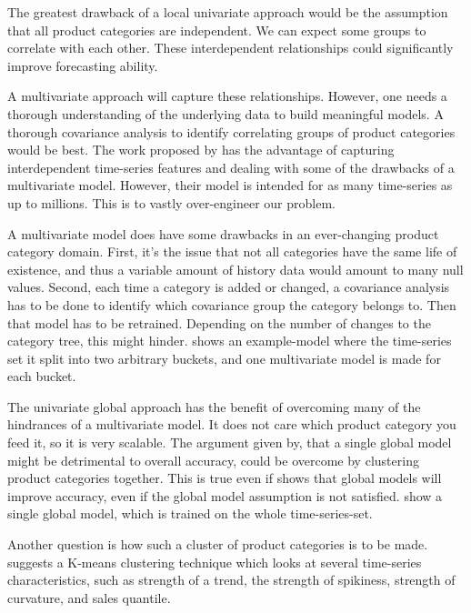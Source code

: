 The greatest drawback of a local univariate approach would be the assumption that all product categories
are independent. We can expect some groups to correlate with each other. These interdependent relationships
could significantly improve forecasting ability.

A multivariate approach will capture these relationships.
However, one needs a thorough understanding of the underlying data to build meaningful models.
A thorough covariance analysis to identify correlating groups of product categories would be best.
The work proposed by \cite{Sen2019} has the advantage of capturing interdependent time-series features and dealing with
some of the drawbacks of a multivariate model. However, their model is intended for as many time-series as up to millions.
This is to vastly over-engineer our problem.

A multivariate model does have some drawbacks in an ever-changing product category domain.
First, it's the issue that not all categories have the same life of existence, and thus a variable
amount of history data would amount to many null values.
Second, each time a category is added or changed, a covariance analysis has to be done to identify
which covariance group the category belongs to. Then that model has to be retrained.
Depending on the number of changes to the category tree, this might hinder.
 shows an example-model where the time-series set it split into two arbitrary buckets,
and one multivariate model is made for each bucket.

The univariate global approach has the benefit of overcoming many of the hindrances of a multivariate model.
It does not care which product category you feed it, so it is very scalable. The argument given by\cite{Bandara2017},
that a single global model might be detrimental to overall accuracy, could be overcome by clustering product categories together.
This is true even if \cite{Rabanser2020}
shows that global models will improve accuracy, even if the global model assumption is not satisfied.
 show a single global model, which is trained on the whole time-series-set.

Another question is how such a cluster of product categories is to be made.
\cite{Bandara2017} suggests a K-means clustering technique
which looks at several time-series characteristics, such as
strength of a trend, the strength of spikiness, strength of curvature,
and sales quantile.

